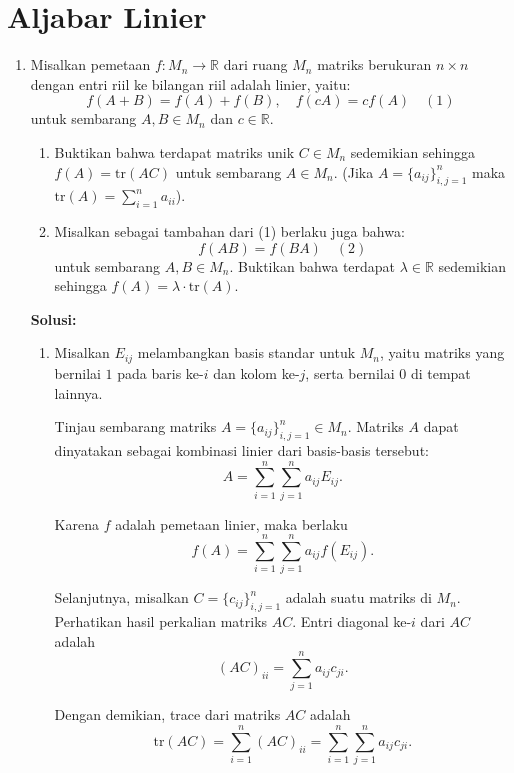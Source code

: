 \documentclass[11pt,a4paper]{article}
\newcommand{\R}{\mathbb{R}}
\begin{document}
\section*{Aljabar Linier}

\begin{enumerate}
  \item Misalkan pemetaan $f : M_n \to \R$ dari ruang $M_n$ matriks berukuran $n \times n$ dengan entri riil ke bilangan riil adalah linier, yaitu:
        \[
          f(A + B) = f(A) + f(B), \quad f(cA) = cf(A) \quad (1)
        \]
        untuk sembarang $A, B \in M_n$ dan $c \in \R$.
        \begin{enumerate}
          \item Buktikan bahwa terdapat matriks unik $C \in M_n$ sedemikian sehingga $f(A) = \text{tr}(AC)$ untuk sembarang $A \in M_n$. (Jika $A = \{a_{ij}\}_{i,j=1}^n$ maka $\text{tr}(A) = \sum_{i=1}^n a_{ii}$).
          \item Misalkan sebagai tambahan dari (1) berlaku juga bahwa:
                \[
                  f(AB) = f(BA) \quad (2)
                \]
                untuk sembarang $A, B \in M_n$. Buktikan bahwa terdapat $\lambda \in \R$ sedemikian sehingga $f(A) = \lambda \cdot \text{tr}(A)$.

        \end{enumerate}

        \textbf{Solusi:}
        \begin{enumerate}
          \item Misalkan $E_{ij}$ melambangkan basis standar untuk $M_n$, yaitu matriks yang bernilai $1$ pada baris ke-$i$ dan kolom ke-$j$, serta bernilai $0$ di tempat lainnya.

                Tinjau sembarang matriks $A = \{a_{ij}\}_{i,j=1}^n \in M_n$. Matriks $A$ dapat dinyatakan sebagai kombinasi linier dari basis-basis tersebut:
                \[
                  A = \sum_{i=1}^n \sum_{j=1}^n a_{ij} E_{ij}.
                \]

                Karena $f$ adalah pemetaan linier, maka berlaku
                \[
                  f(A) = \sum_{i=1}^n \sum_{j=1}^n a_{ij} f(E_{ij}).
                \]

                Selanjutnya, misalkan $C = \{c_{ij}\}_{i,j=1}^n$ adalah suatu matriks di $M_n$. Perhatikan hasil perkalian matriks $AC$. Entri diagonal ke-$i$ dari $AC$ adalah
                \[
                  (AC)_{ii} = \sum_{j=1}^n a_{ij} c_{ji}.
                \]

                Dengan demikian, trace dari matriks $AC$ adalah
                \[
                  \text{tr}(AC) = \sum_{i=1}^n (AC)_{ii} = \sum_{i=1}^n \sum_{j=1}^n a_{ij} c_{ji}.
                \]


\end{enumerate}
\end{enumerate}
\end{document}
